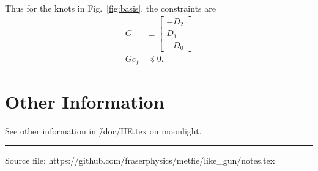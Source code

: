 \documentclass[11pt]{article}
\newcommand\cf{c_f}
\begin{document}
Thus for the knots in Fig.~\ref{fig:basis}, the constraints are
\begin{align}
  G & \equiv
      \begin{bmatrix}
        - D_2 \\ D_1 \\ -D_0
      \end{bmatrix}\\
  \label{eq:constraint}
  G\cf & \preceq 0.
\end{align}


\section{Other Information}
\label{sec:appendix}

See other information in \~/doc/HE.tex on moonlight.

%
\vfill \hrule

Source file: https://github.com/fraserphysics/metfie/like\_gun/notes.tex
\end{document}
